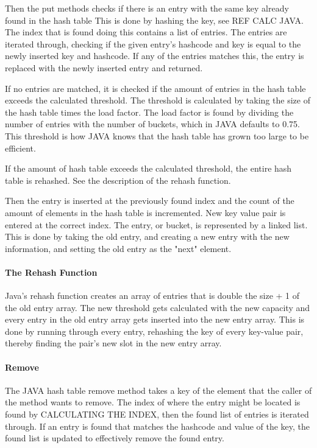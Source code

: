 \documentclass[titlepage]{article}
\begin{document}
	Then the put methods checks if there is an entry with the same key already found in the hash table This is done by hashing the key, see REF CALC JAVA.
	The index that is found doing this contains a list of entries. The entries are iterated through, checking if the given entry's hashcode and key is equal to the newly inserted key and hashcode. If any of the entries matches this, the entry is replaced with the newly inserted entry and returned.
	
	If no entries are matched, it is checked if the amount of entries in the hash table exceeds the calculated threshold. The threshold is calculated by taking the size of the hash table times the load factor. The load factor is found by dividing the number of entries with the number of buckets, which in JAVA defaults to 0.75. This threshold is how JAVA knows that the hash table has grown too large to be efficient. 
	
	If the amount of hash table exceeds the calculated threshold, the entire hash table is rehashed. See the description of the rehash function.
	
	
	Then the entry is inserted at the previously found index and the count of the amount of elements in the hash table is incremented. 
	New key value pair is entered at the correct index. The entry, or bucket, is represented by a linked list.
	This is done by taking the old entry, and creating a new entry with the new information, and setting the old entry as the "next" element.
	
	\paragraph{The Rehash Function}
	Java's rehash function creates an array of entries that is double the size + 1 of the old entry array. The new threshold gets calculated with the new capacity and every entry in the old entry array gets inserted into the new entry array. This is done by running through every entry, rehashing the key of every key-value pair, thereby finding the pair's new slot in the new entry array. 
	
	\paragraph{Remove}
	The JAVA hash table remove method takes a key of the element that the caller of the method wants to remove. The index of where the entry might be located is found by CALCULATING THE INDEX, then the found list of entries is iterated through. If an entry is found that matches the hashcode and value of the key, the found list is updated to effectively remove the found entry. 
	
\end{document}
